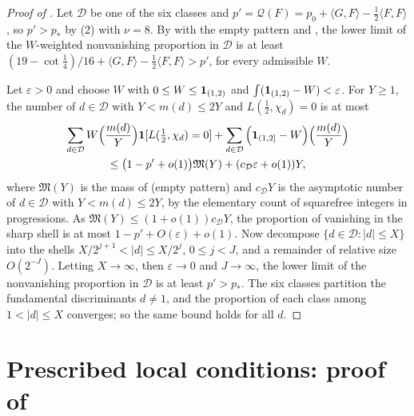 \documentclass[11pt,colorlinks]{charlie}
\newcommand{\cD}{\mathcal{D}}
\newcommand{\pstar}{p_\ast}
\begin{document}
\begin{proof}[Proof of ]
Let $\cD$ be one of the six classes and $p'=\mathcal Q(F)=p_0+\langle G,F\rangle-\frac12\langle F,F\rangle$, so $p'>\pstar$ by (2) with $\nu=8$. By  with the empty pattern and , the lower limit of the $W$-weighted nonvanishing proportion in $\cD$ is at least $(19-\cot\frac14)/16+\langle G,F\rangle-\frac12\langle F,F\rangle>p'$, for every admissible $W$.

Let $\varepsilon>0$ and choose $W$ with $0\le W\le\mathbf{1}_{(1,2)}$ and $\int(\mathbf{1}_{(1,2)}-W)<\varepsilon$. For $Y\ge1$, the number of $d\in\cD$ with $Y<m(d)\le2Y$ and $L(\frac12,\chi_d)=0$ is at most
\begin{multline*}
 \sum_{d\in\cD}W\Big(\frac{m(d)}Y\Big)\one[L(\tfrac12,\chi_d)=0]+\sum_{d\in\cD}\Big(\one_{(1,2]}-W\Big)\Big(\frac{m(d)}Y\Big)\\
 \le\big(1-p'+o(1)\big)\mathfrak M(Y)+(c_\cD\varepsilon+o(1))Y,
\end{multline*}
where $\mathfrak M(Y)$ is the mass of  (empty pattern) and $c_\cD Y$ is the asymptotic number of $d\in\cD$ with $Y<m(d)\le2Y$, by the elementary count of squarefree integers in progressions. As $\mathfrak M(Y)\le(1+o(1))c_\cD Y$, the proportion of vanishing in the sharp shell is at most $1-p'+O(\varepsilon)+o(1)$. Now decompose $\{d\in\cD:|d|\le X\}$ into the shells $X/2^{j+1}<|d|\le X/2^j$, $0\le j<J$, and a remainder of relative size $O(2^{-J})$. Letting $X\to\infty$, then $\varepsilon\to0$ and $J\to\infty$, the lower limit of the nonvanishing proportion in $\cD$ is at least $p'>\pstar$. The six classes partition the fundamental discriminants $d\ne1$, and the proportion of each class among $1<|d|\le X$ converges; so the same bound holds for all $d$.
\end{proof}

\section{Prescribed local conditions: proof of \texorpdfstring{}{Theorem 2}}\label{sec:local}
\end{document}
